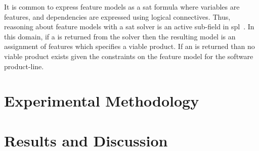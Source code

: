 It is common to express feature models as a \ac{sat} formula where variables are
features, and dependencies are expressed using logical connectives. Thus,
reasoning about feature models with a \ac{sat} solver is an active sub-field in
\acl{spl}~\cite{BSRC10,GBT+19,BSTRC06,TAK+:SE15}. In this domain, if a 
is returned from the solver then the resulting model is an assignment of
features which specifies a viable product. If an  is returned than no
viable product exists given the constraints on the feature model for the
software product-line.

\section{Experimental Methodology}

%
\section{Results and Discussion}



